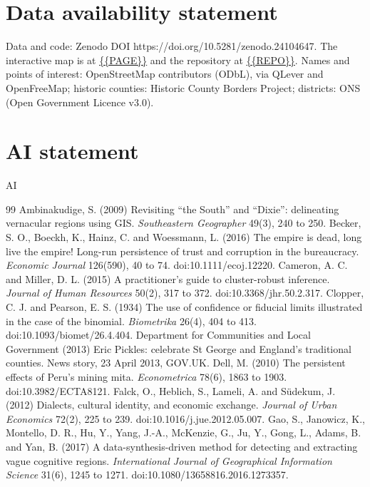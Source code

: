 \documentclass[11pt,a4paper]{article}
\begin{document}
\section*{Data availability statement}
Data and code: Zenodo DOI https://doi.org/10.5281/zenodo.24104647. The interactive map is at \url{{{PAGE}}} and the repository at \url{{{REPO}}}. Names and points of interest: OpenStreetMap contributors (ODbL), via QLever and OpenFreeMap; historic counties: Historic County Borders Project; districts: ONS (Open Government Licence v3.0).

\section*{AI statement}
{{AI}}

\begin{thebibliography}{99}
 Ambinakudige, S. (2009) Revisiting ``the South'' and ``Dixie'': delineating vernacular regions using GIS. \textit{Southeastern Geographer} 49(3), 240 to 250.
 Becker, S. O., Boeckh, K., Hainz, C. and Woessmann, L. (2016) The empire is dead, long live the empire! Long-run persistence of trust and corruption in the bureaucracy. \textit{Economic Journal} 126(590), 40 to 74. doi:10.1111/ecoj.12220.
 Cameron, A. C. and Miller, D. L. (2015) A practitioner's guide to cluster-robust inference. \textit{Journal of Human Resources} 50(2), 317 to 372. doi:10.3368/jhr.50.2.317.
 Clopper, C. J. and Pearson, E. S. (1934) The use of confidence or fiducial limits illustrated in the case of the binomial. \textit{Biometrika} 26(4), 404 to 413. doi:10.1093/biomet/26.4.404.
 Department for Communities and Local Government (2013) Eric Pickles: celebrate St George and England's traditional counties. News story, 23 April 2013, GOV.UK.
 Dell, M. (2010) The persistent effects of Peru's mining mita. \textit{Econometrica} 78(6), 1863 to 1903. doi:10.3982/ECTA8121.
 Falck, O., Heblich, S., Lameli, A. and S\"udekum, J. (2012) Dialects, cultural identity, and economic exchange. \textit{Journal of Urban Economics} 72(2), 225 to 239. doi:10.1016/j.jue.2012.05.007.
 Gao, S., Janowicz, K., Montello, D. R., Hu, Y., Yang, J.-A., McKenzie, G., Ju, Y., Gong, L., Adams, B. and Yan, B. (2017) A data-synthesis-driven method for detecting and extracting vague cognitive regions. \textit{International Journal of Geographical Information Science} 31(6), 1245 to 1271. doi:10.1080/13658816.2016.1273357.

\end{thebibliography}
\end{document}
